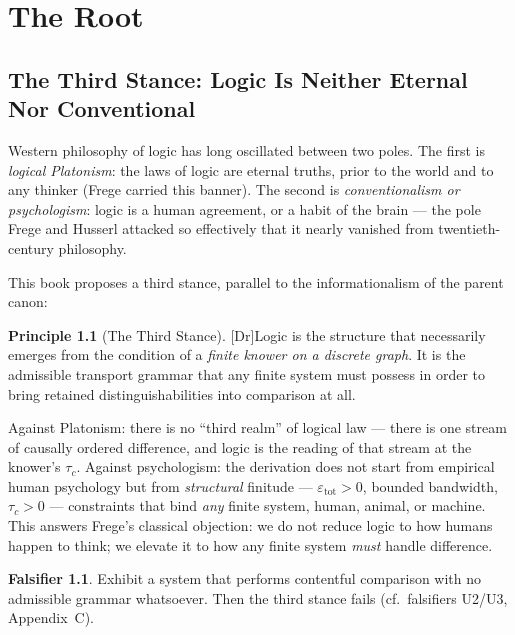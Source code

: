 \documentclass[11pt,a4paper,twoside]{book}
\newcommand{\tier}[1]{\textnormal{\small\textsf{[#1]}}}
\newcommand{\Dr}{\tier{Dr}}\newcommand{\Cj}{\tier{Cj}}\newcommand{\Wf}{\tier{Wf}}
\theoremstyle{plain}
\theoremstyle{definition}
\newtheorem{principle}[theorem]{Principle}
\newtheorem{falsifier}[theorem]{Falsifier}
\theoremstyle{remark}
\begin{document}
\tableofcontents

\mainmatter

\part{The Root}

\chapter{The Third Stance: Logic Is Neither Eternal Nor Conventional}

Western philosophy of logic has long oscillated between two poles. The first
is \emph{logical Platonism}: the laws of logic are eternal truths, prior to
the world and to any thinker (Frege carried this banner). The second is
\emph{conventionalism or psychologism}: logic is a human agreement, or a habit
of the brain --- the pole Frege and Husserl attacked so effectively that it
nearly vanished from twentieth-century philosophy.

This book proposes a third stance, parallel to the informationalism of the
parent canon:

\begin{principle}[The Third Stance]\Dr\label{prin:third}
Logic is the structure that necessarily emerges from the condition of a
\emph{finite knower on a discrete graph}. It is the admissible transport
grammar that any finite system must possess in order to bring retained
distinguishabilities into comparison at all.
\end{principle}

Against Platonism: there is no ``third realm'' of logical law --- there is one
stream of causally ordered difference, and logic is the reading of that stream
at the knower's $\tau_c$. Against psychologism: the derivation does not start
from empirical human psychology but from \emph{structural} finitude ---
$\varepsilon_{\mathrm{tot}}>0$, bounded bandwidth, $\tau_c>0$ --- constraints
that bind \emph{any} finite system, human, animal, or machine. This answers
Frege's classical objection: we do not reduce logic to how humans happen to
think; we elevate it to how any finite system \emph{must} handle difference.

\begin{falsifier}
Exhibit a system that performs contentful comparison with no admissible
grammar whatsoever. Then the third stance fails (cf.\ falsifiers U2/U3,
Appendix~C).
\end{falsifier}
\end{document}
